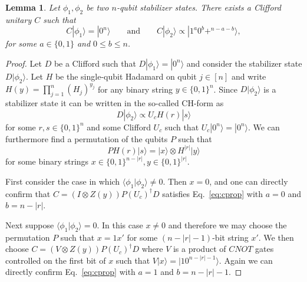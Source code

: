 \documentclass[a4paper,onecolumn,11pt,accepted=2021-11-11]{quantumarticle}
\newtheorem{lem}{Lemma}
\newcommand{\ket}[1]{\ensuremath{\lvert #1 \rangle}}
\begin{document}
\begin{lem}
Let $\phi_1,\phi_2$ be two $n$-qubit stabilizer states. There exists a Clifford unitary $C$ such that 
\begin{equation}
C|\phi_1\rangle=|0^n\rangle \qquad \text{and} \qquad C|\phi_2\rangle\propto |1^a0^{b} +^{n-a-b}\rangle,
\label{eq:cprop}
\end{equation}
for some $a\in \{0,1\}$ and $0\leq b\leq n$.
\label{lem:gen}
\end{lem}
\begin{proof}
Let $D$ be a Clifford such that $D|\phi_1\rangle=|0^n\rangle$ and consider the stabilizer state $D|\phi_2\rangle$. Let $H$ be the single-qubit Hadamard on qubit $j\in [n]$ and write $H(y)=\prod_{j=1}^{n} (H_j)^{y_j}$ for any binary string $y\in \{0,1\}^n$.  Since $D|\phi_2\rangle$ is a stabilizer state it can be written in the so-called CH-form \cite{bravyi2018simulation} as
\begin{equation}
D|\phi_2\rangle \propto U_c H(r)|s\rangle
\label{eq:ch}
\end{equation}
for some $r,s\in \{0,1\}^n$ and some Clifford $U_c$ such that $U_c|0^n\rangle=|0^n\rangle$. 
We can furthermore find a permutation of the qubits $P$ such that
$$
P H(r) |s\rangle = \ket{x} \otimes H^{|r|} \ket{y}
$$
for some binary strings $x\in \{0,1\}^{n-|r|}, y\in \{0,1\}^{|r|}$.

First consider the case in which $\langle \phi_1|\phi_2\rangle\neq 0$.
Then $x=0$, and one can directly confirm that $C = (I\otimes Z(y))P(U_c)^{\dagger} D $ satisfies Eq.~\eqref{eq:cprop} with $a=0$ and $b=n-|r|$.

Next suppose  $\langle \phi_1|\phi_2\rangle=0$. In this case $x\neq 0$ and therefore we may choose the permutation $P$ such that $x=1x'$ for some $(n-|r|-1)$-bit string $x'$. We then choose $C=(V\otimes Z(y))P(U_c)^{\dagger} D$ where $V$ is a product of $CNOT$ gates controlled on the first bit of $x$ such that $V|x\rangle=|10^{n-|r|-1}\rangle$. Again we can directly confirm Eq.~\eqref{eq:cprop} with $a=1$ and $b=n-|r|-1$.
\end{proof}
\end{document}

